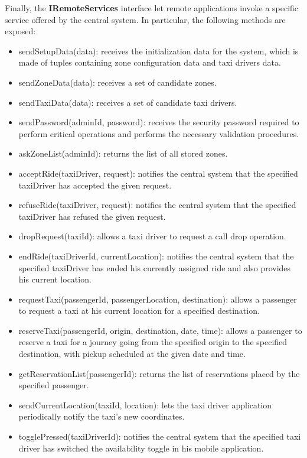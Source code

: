 Finally, the \textbf{IRemoteServices} interface let remote applications invoke a specific service offered by the central system. In particular, the following methods are exposed: 
\begin{itemize}
	\item sendSetupData(data): receives the initialization data for the system, which is made of tuples containing zone configuration data and taxi drivers data.
	\item sendZoneData(data): receives a set of candidate zones.
	\item sendTaxiData(data): receives a set of candidate taxi drivers.
	\item sendPassword(adminId, password): receives the security password required to perform critical operations and performs the necessary validation procedures.
	\item askZoneList(adminId): returns the list of all stored zones.
	\item acceptRide(taxiDriver, request): notifies the central system that the specified taxiDriver has accepted the given request.
	\item refuseRide(taxiDriver, request): notifies the central system that the specified taxiDriver has refused the given request.
	\item dropRequest(taxiId): allows a taxi driver to request a call drop operation.
	\item endRide(taxiDriverId, currentLocation): notifies the central system that the specified taxiDriver has ended his currently assigned ride and also provides his current location.
	\item requestTaxi(passengerId, passengerLocation, destination): allows a passenger to request a taxi at his current location for a specified destination.
	\item reserveTaxi(passengerId, origin, destination, date, time): allows a passenger to reserve a taxi for a journey going from the specified origin to the specified destination, with pickup scheduled at the given date and time.
	\item getReservationList(passengerId): returns the list of reservations placed by the specified passenger.
	\item sendCurrentLocation(taxiId, location): lets the taxi driver application periodically notify the taxi's new coordinates.
	\item togglePressed(taxiDriverId): notifies the central system that the specified taxi driver has switched the availability toggle in his mobile application.
\end{itemize}

